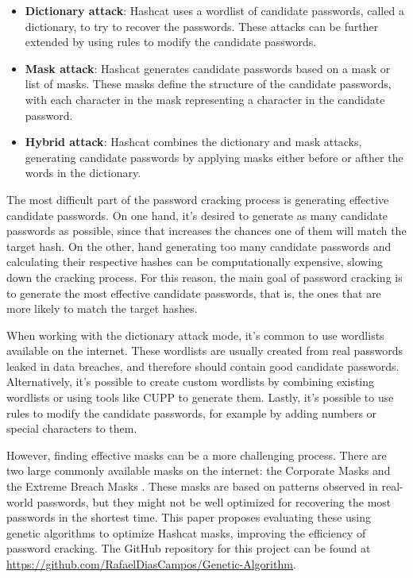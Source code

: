 \documentclass[sigconf,authordraft]{acmart}
\begin{document}
\begin{itemize}
  \item \textbf{Dictionary attack}: Hashcat uses a wordlist of candidate passwords, called a dictionary, to try to recover the passwords.
These attacks can be further extended by using rules to modify the candidate passwords.

  \item \textbf{Mask attack}: Hashcat generates candidate passwords based on a mask or list of masks.
These masks define the structure of the candidate passwords, with each character in the mask representing a character in the candidate password.

  \item \textbf{Hybrid attack}: Hashcat combines the dictionary and mask attacks, generating candidate passwords by applying masks either before or afther the words in the dictionary.
\end{itemize}

The most difficult part of the password cracking process is generating effective candidate passwords.
On one hand, it's desired to generate as many candidate passwords as possible, since that increases the chances one of them will match the target hash.
On the other, hand generating too many candidate passwords and calculating their respective hashes can be computationally expensive, slowing down the cracking process.
For this reason, the main goal of password cracking is to generate the most effective candidate passwords, that is, the ones that are more likely to match the target hashes.

When working with the dictionary attack mode, it's common to use wordlists available on the internet.
These wordlists are usually created from real passwords leaked in data breaches, and therefore should contain good candidate passwords.
Alternatively, it's possible to create custom wordlists by combining existing wordlists or using tools like CUPP \cite{cupp} to generate them.
Lastly, it's possible to use rules to modify the candidate passwords, for example by adding numbers or special characters to them.

However, finding effective masks can be a more challenging process.
There are two large commonly available masks on the internet: the Corporate Masks \cite{corporate_masks} and the Extreme Breach Masks \cite{extreme_breach_masks}.
These masks are based on patterns observed in real-world passwords, but they might not be well optimized for recovering the most passwords in the shortest time.
This paper proposes evaluating these using genetic algorithms to optimize Hashcat masks, improving the efficiency of password cracking.
The GitHub repository for this project can be found at \url{https://github.com/RafaelDiasCampos/Genetic-Algorithm}.
\end{document}
